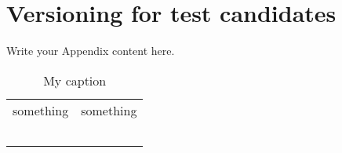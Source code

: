 
\chapter{Versioning for test candidates} %

\label{AppendixA} %


Write your Appendix content here.

\begin{savenotes}
\begin{table}[h!]
\centering
\begin{tabular}{|c|c|}
\hline
something& something  \\
 &  \\
 &  \\
 &  \\
 &  \\
 & \\
\hline
\end{tabular}
\caption{My caption}
\label{my-label}
\end{table}
\end{savenotes}

